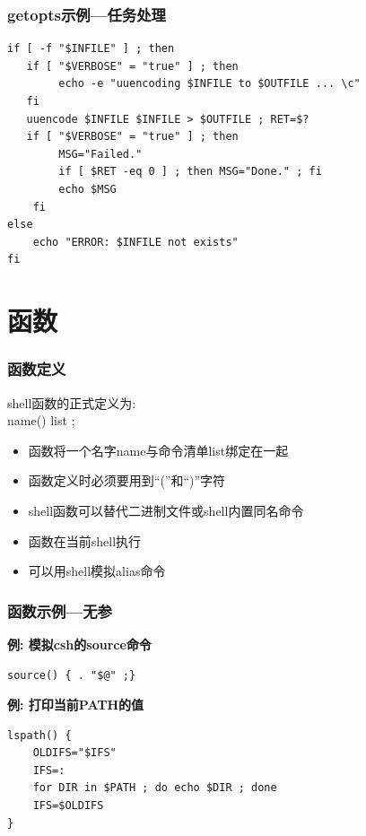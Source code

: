 \documentclass[compress]{beamer}
\begin{document}
\begin{frame}[fragile]
\frametitle{getopts示例---任务处理}

\begin{lstlisting}[firstnumber=last]
if [ -f "$INFILE" ] ; then
   if [ "$VERBOSE" = "true" ] ; then
        echo -e "uuencoding $INFILE to $OUTFILE ... \c"
   fi
   uuencode $INFILE $INFILE > $OUTFILE ; RET=$?
   if [ "$VERBOSE" = "true" ] ; then
        MSG="Failed."
        if [ $RET -eq 0 ] ; then MSG="Done." ; fi
        echo $MSG
    fi
else
    echo "ERROR: $INFILE not exists"
fi
\end{lstlisting}
\end{frame}

\section{函数}

\begin{frame}
\frametitle{函数定义}

shell函数的正式定义为:\\
name() { list ; }

\begin{itemize}
\item 函数将一个名字name与命令清单list绑定在一起
\item 函数定义时必须要用到``(''和``)''字符
\item shell函数可以替代二进制文件或shell内置同名命令
\item 函数在当前shell执行
\item 可以用shell模拟alias命令
\end{itemize}


\end{frame}

\begin{frame}[fragile]
\frametitle{函数示例---无参}

\noindent \textbf{例: 模拟csh的source命令}\\[1ex]
\begin{lstlisting}
source() { . "$@" ;}
\end{lstlisting}

\pause
\noindent \textbf{例: 打印当前PATH的值} \\
\begin{lstlisting}
lspath() {
    OLDIFS="$IFS"
    IFS=:
    for DIR in $PATH ; do echo $DIR ; done
    IFS=$OLDIFS
}
\end{lstlisting}
\end{frame}
\end{document}
